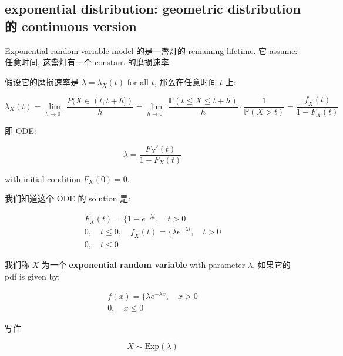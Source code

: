 \subsection{exponential distribution: geometric distribution 的 continuous version}\label{exponential-distribution-geometric-distribution-ux7684-continuous-version}

Exponential random variable model 的是一盏灯的 remaining lifetime. 它 assume: 任意时间, 这盏灯有一个 constant 的磨损速率.

假设它的磨损速率是 \(\mathit{\lambda} = \mathit{\lambda}_{\mathit{X}}(\mathit{t})\) for all \(\mathit{t}\), 那么在任意时间 \(\mathit{t}\) 上:

\[\mathit{\lambda}_{\mathit{X}}(\mathit{t}) = \lim\limits_{h\rightarrow 0^{+}}\frac{\mathit{P}(\mathit{X} \in (\mathit{t},\mathit{t} + h\rbrack)}{h} = \lim\limits_{h\rightarrow 0^{+}}\frac{\mathbb{P}(\mathit{t} \leq \mathit{X} \leq \mathit{t} + h)}{h} \cdot \frac{1}{\mathbb{P}(\mathit{X} > \mathit{t})} = \frac{\mathit{f}_{\mathit{X}}(\mathit{t})}{1 - \mathit{F}_{\mathit{X}}(\mathit{t})}\]

即 ODE:

\[\mathit{\lambda} = \frac{\mathit{F}_{\mathit{X}}'(\mathit{t})}{1 - \mathit{F}_{\mathit{X}}(\mathit{t})}\]

with initial condition \(\mathit{F}_{\mathit{X}}(0) = 0\).

我们知道这个 ODE 的 solution 是:

\[\begin{matrix}
{\mathit{F}_{\mathit{X}}(\mathit{t}) = \{ 1 - \mathit{e}^{- \mathit{\lambda}\mathit{t}},\quad\mathit{t} > 0} \\
{0,\quad\mathit{t} \leq 0,\quad\mathit{f}_{\mathit{X}}(\mathit{t}) = \{\mathit{\lambda}\mathit{e}^{- \mathit{\lambda}\mathit{t}},\quad\mathit{t} > 0} \\
{0,\quad\mathit{t} \leq 0}
\end{matrix}\]

\begin{definition}{}

我们称 \(\mathit{X}\) 为一个 \textbf{exponential random variable} with parameter \(\mathit{\lambda}\), 如果它的 pdf is given by:

\[\begin{matrix}
{\mathit{f}(\mathit{x}) = \{\mathit{\lambda}\mathit{e}^{- \mathit{\lambda}\mathit{x}},\quad\mathit{x} > 0} \\
{0,\quad\mathit{x} \leq 0}
\end{matrix}\]

写作

\[\mathit{X} \sim \text{Exp}(\mathit{\lambda})\]

\end{definition}

